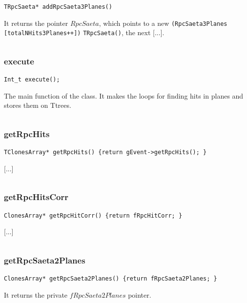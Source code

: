 \documentclass[a4paper]{book}
\begin{document}
\begin{lstlisting}
TRpcSaeta* addRpcSaeta3Planes()
\end{lstlisting}

It returns the pointer $RpcSaeta$, which points to a new \texttt{(RpcSaeta3Planes} \texttt{[totalNHits3Planes++])} \texttt{TRpcSaeta()}, the next [...].

\[\]

\subsubsection{execute}

\begin{lstlisting}
Int_t execute();
\end{lstlisting}

The main function of the class. It makes the loops for finding hits in planes and stores them on Ttrees.

\[\]

\subsubsection{getRpcHits}

\begin{lstlisting}
TClonesArray* getRpcHits() {return gEvent->getRpcHits(); }
\end{lstlisting}

[...]

\[\]

\subsubsection{getRpcHitsCorr}

\begin{lstlisting}
ClonesArray* getRpcHitCorr() {return fRpcHitCorr; }
\end{lstlisting}

[...]

\[\]

\subsubsection{getRpcSaeta2Planes}

\begin{lstlisting}
ClonesArray* getRpcSaeta2Planes() {return fRpcSaeta2Planes; }
\end{lstlisting}

It returns the private $fRpcSaeta2Planes$ pointer.
\end{document}
